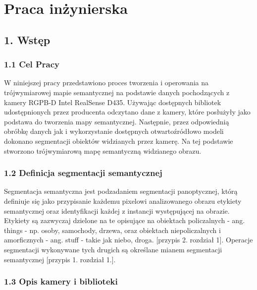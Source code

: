 \documentclass[
]{article}
\author{}
\date{}
\begin{document}
\section{Praca inżynierska}\label{praca-inux17cynierska}

\subsection{1. Wstęp}\label{wstux119p}

\subsubsection{1.1 Cel Pracy}\label{cel-pracy}

W niniejszej pracy przedstawiono proces tworzenia i operowania na trójwymiarowej mapie semantycznej na podstawie danych pochodzących z kamery RGPB-D Intel RealSense D435.
Używając dostępnych bibliotek udostępnionych przez producenta odczytano dane z kamery, które posłużyły jako podstawa do tworzenia mapy semantycznej. Następnie, przez odpowiednią obróbkę danych jak i wykorzystanie dostępnych otwartoźródłowo modeli dokonano segmentacji obiektów widzianych przez kamerę. Na tej podstawie stworzono trójwymiarową mapę semantyczną widzianego obrazu.

\subsubsection{1.2 Definicja segmentacji semantycznej}\label{definicja-segmentacji-semantycznej}

Segmentacja semantyczna jest podzadaniem segmentacji panoptycznej, którą definiuje się jako przypisanie każdemu pixelowi analizowanego obrazu etykiety semantycznej oraz identyfikacji każdej z instancji występującej na obrazie. Etykiety są zazwyczaj dzielone na te opisujące na obiektach policzalnych - ang. things - np. osoby, samochody, drzewa, oraz obiektach niepoliczalnych i amorficznych - ang. stuff - takie jak niebo, droga. {[}przypis 2. rozdział 1{]}. Operacje segmentacji wykonywane tych drugich są określane mianem segmentacji semantycznej {[}przypis 1. rozdział 1.{]}.

\subsubsection{1.3 Opis kamery i biblioteki}\label{opis-kamery-i-biblioteki}
\end{document}

